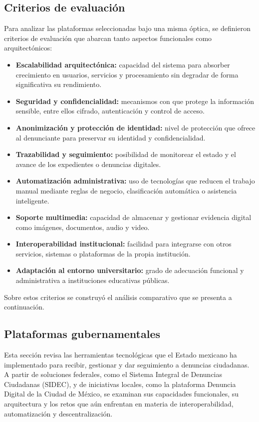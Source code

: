 	\subsection{Criterios de evaluación}
	Para analizar las plataformas seleccionadas bajo una misma óptica, se definieron criterios de
	evaluación que abarcan tanto aspectos funcionales como arquitectónicos:
	
	\begin{itemize}
		\item \textbf{Escalabilidad arquitectónica:} capacidad del sistema para absorber crecimiento en
		usuarios, servicios y procesamiento sin degradar de forma significativa su rendimiento.
	
		\item \textbf{Seguridad y confidencialidad:} mecanismos con que protege la información sensible,
		entre ellos cifrado, autenticación y control de acceso.
	
		\item \textbf{Anonimización y protección de identidad:} nivel de protección que ofrece al
		denunciante para preservar su identidad y confidencialidad.
	
		\item \textbf{Trazabilidad y seguimiento:} posibilidad de monitorear el estado y el avance de los
		expedientes o denuncias digitales.
	
		\item \textbf{Automatización administrativa:} uso de tecnologías que reducen el trabajo manual
		mediante reglas de negocio, clasificación automática o asistencia inteligente.
	
		\item \textbf{Soporte multimedia:} capacidad de almacenar y gestionar evidencia digital como
		imágenes, documentos, audio y video.
	
		\item \textbf{Interoperabilidad institucional:} facilidad para integrarse con otros servicios,
		sistemas o plataformas de la propia institución.
	
		\item \textbf{Adaptación al entorno universitario:} grado de adecuación funcional y administrativa
		a instituciones educativas públicas.
	\end{itemize}
	
	Sobre estos criterios se construyó el análisis comparativo que se presenta a continuación.
	
	\subsection{Plataformas gubernamentales}
	Esta sección revisa las herramientas tecnológicas que el Estado mexicano ha implementado para
	recibir, gestionar y dar seguimiento a denuncias ciudadanas. A partir de soluciones federales, como
	el Sistema Integral de Denuncias Ciudadanas (SIDEC), y de iniciativas locales, como la plataforma
	Denuncia Digital de la Ciudad de México, se examinan sus capacidades funcionales, su arquitectura y
	los retos que aún enfrentan en materia de interoperabilidad, automatización y descentralización.
	
